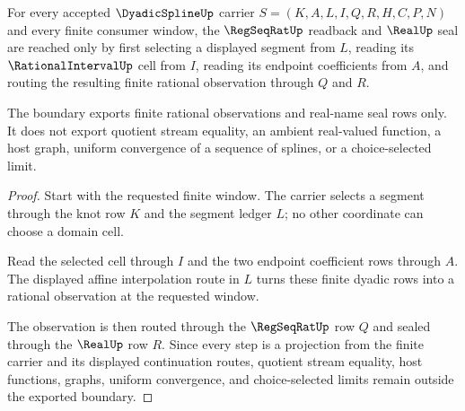 \begin{theorem}
\label{thm:dyadic-spline-regseqrat-real-boundary}
For every accepted $\DyadicSplineUp$ carrier $S=(K,A,L,I,Q,R,H,C,P,N)$ and every finite consumer window, the $\RegSeqRatUp$ readback and $\RealUp$ seal are reached only by first selecting a displayed segment from $L$, reading its $\RationalIntervalUp$ cell from $I$, reading its endpoint coefficients from $A$, and routing the resulting finite rational observation through $Q$ and $R$.

The boundary exports finite rational observations and real-name seal rows only. It does not export quotient stream equality, an ambient real-valued function, a host graph, uniform convergence of a sequence of splines, or a choice-selected limit.
\end{theorem}
\begin{proof}
Start with the requested finite window. The carrier selects a segment through the knot row $K$ and the segment ledger $L$; no other coordinate can choose a domain cell.

Read the selected cell through $I$ and the two endpoint coefficient rows through $A$. The displayed affine interpolation route in $L$ turns these finite dyadic rows into a rational observation at the requested window.

The observation is then routed through the $\RegSeqRatUp$ row $Q$ and sealed through the $\RealUp$ row $R$. Since every step is a projection from the finite carrier and its displayed continuation routes, quotient stream equality, host functions, graphs, uniform convergence, and choice-selected limits remain outside the exported boundary.
\end{proof}

